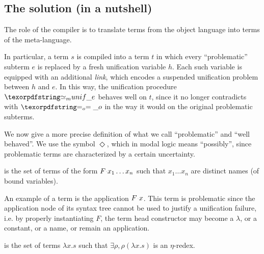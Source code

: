 
\subsection{The solution (in a nutshell)}
\label{sec:nutshell}

The role of the compiler is to translate terms from the object language into
terms of the meta-language.

In particular, a term $s$ is compiled into a term $t$ in which every
``problematic'' subterm $e$ is replaced by a fresh unification variable $h$.
Each such variable is equipped with an additional \emph{link}, which encodes a
suspended unification problem between $h$ and $e$. In this way, the
unification procedure $\Ue$ behaves well on $t$, since it no longer
contradicts with $\Eo$ in the way it would on the original problematic
subterms.

We now give a more precise definition of what we call ``problematic'' and
``well behaved''. We use the symbol $\Diamond$, which in modal logic means
``possibly'', since problematic terms are characterized by a certain
uncertainty.

\begin{definition}[\maybebeta]\label{def:maybebeta}
  \maybebeta is the set of terms of the form $F \appsep x_1 \ldots x_n$
  such that $x_1 \ldots x_n$ are distinct names (of bound variables).
\end{definition}

\noindent
An example of a \maybebeta{} term is the application $F \appsep x$. This term is
problematic since the application node of its syntax tree cannot be used to
justify a unification failure, i.e. by properly instantiating $F$, the term head
constructor may become a $\lambda$, or a constant, or a name, or remain an
application.

\begin{definition}[\maybeeta]\label{def:maybeeta}
  \maybeeta is the set of terms $\lambda x.s$ such that $\exists \rho, \rho (\lambda x.s)$
  is an $\eta$-redex. %
\end{definition}

